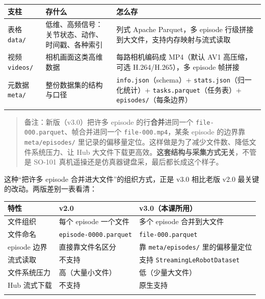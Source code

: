 \documentclass[
  chinese,
]{ctexart}
\begin{document}
\begin{center}
\begin{tabular}{@{}>{\raggedright\arraybackslash}p{} >{\raggedright\arraybackslash}p{} >{\raggedright\arraybackslash}p{}@{}}
\toprule\noalign{}
支柱 & 存什么 & 怎么存 \\
\midrule\noalign{}
表格 \texttt{data/} & 低维、高频信号：关节状态、动作、时间戳、各种索引 & 列式 Apache Parquet，多 episode 行级拼接到大文件，支持内存映射与流式读取 \\
视频 \texttt{videos/} & 相机画面这类高维数据 & 每路相机编码成 MP4（默认 AV1 高压缩，可选 H.264/H.265），多 episode 帧拼接 \\
元数据 \texttt{meta/} & 整份数据集的结构与口径 & \texttt{info.json}（schema）+ \texttt{stats.json}（归一化统计）+ \texttt{tasks.parquet}（任务表）+ \texttt{episodes/}（每条边界） \\
\bottomrule\noalign{}
\end{tabular}
\end{center}

\begin{quote}
备注：新版（v3.0）把许多 episode 的行\textbf{合并}进同一个
\texttt{file-000.parquet}、帧合并进同一个 \texttt{file-000.mp4}，某条
episode 的边界靠 \texttt{meta/episodes/}
里记录的偏移量定位。这样做是为了减少文件数、降低文件系统压力、让 Hub
大文件下载更高效。\textbf{这套结构与采集方式无关}，不管是 SO-101
真机遥操还是仿真器键盘采，最后都长成这个样子。
\end{quote}

这种``把许多 episode 合并进大文件''的组织方式，正是 v3.0 相比老版 v2.0
最关键的改动。两版差别一表看清：

\begin{center}
\begin{tabular}{@{}>{\raggedright\arraybackslash}p{} >{\raggedright\arraybackslash}p{} >{\raggedright\arraybackslash}p{}@{}}
\toprule\noalign{}
特性 & v2.0 & v3.0（本课所用） \\
\midrule\noalign{}
文件组织 & 每个 episode 一个文件 & 多个 episode 合并到大文件 \\
文件命名 & \texttt{episode-0000.parquet} & \texttt{file-000.parquet} \\
episode 边界 & 直接靠文件名区分 & 靠 \texttt{meta/episodes/} 里的偏移量定位 \\
流式读取 & 不支持 & 支持 \texttt{StreamingLeRobotDataset} \\
文件系统压力 & 高（大量小文件） & 低（少量大文件） \\
Hub 流式下载 & 不支持 & 原生支持 \\
\bottomrule\noalign{}
\end{tabular}
\end{center}
\end{document}

